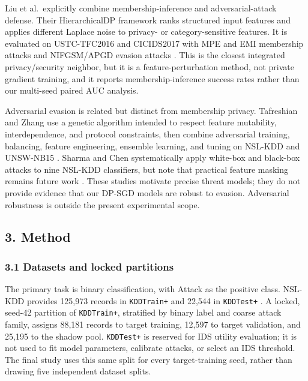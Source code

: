 \documentclass[11pt,a4paper]{article}
\begin{document}
Liu et al.~explicitly combine membership-inference and
adversarial-attack defense. Their HierarchicalDP framework ranks
structured input features and applies different Laplace noise to
privacy- or category-sensitive features. It is evaluated on USTC-TFC2016
and CICIDS2017 with MPE and EMI membership attacks and NIFGSM/APGD
evasion attacks \citep{liu2025hierarchical}. This is the closest
integrated privacy/security neighbor, but it is a feature-perturbation
method, not private gradient training, and it reports
membership-inference success rates rather than our multi-seed paired AUC
analysis.

Adversarial evasion is related but distinct from membership privacy.
Tafreshian and Zhang use a genetic algorithm intended to respect feature
mutability, interdependence, and protocol constraints, then combine
adversarial training, balancing, feature engineering, ensemble learning,
and tuning on NSL-KDD and UNSW-NB15 \citep{tafreshian2025defensive}.
Sharma and Chen systematically apply white-box and black-box attacks to
nine NSL-KDD classifiers, but note that practical feature masking
remains future work \citep{sharma2024systematic}. These studies motivate
precise threat models; they do not provide evidence that our DP-SGD
models are robust to evasion. Adversarial robustness is outside the
present experimental scope.

\hypertarget{method}{%
\subsection{3. Method}\label{method}}

\hypertarget{datasets-and-locked-partitions}{%
\subsubsection{3.1 Datasets and locked
partitions}\label{datasets-and-locked-partitions}}

The primary task is binary classification, with Attack as the positive
class. NSL-KDD provides 125,973 records in \texttt{KDDTrain+} and 22,544
in \texttt{KDDTest+} \citep{tavallaee2009detailed}. A locked, seed-42
partition of \texttt{KDDTrain+}, stratified by binary label and coarse
attack family, assigns 88,181 records to target training, 12,597 to
target validation, and 25,195 to the shadow pool. \texttt{KDDTest+} is
reserved for IDS utility evaluation; it is not used to fit model
parameters, calibrate attacks, or select an IDS threshold. The final
study uses this same split for every target-training seed, rather than
drawing five independent dataset splits.
\end{document}
